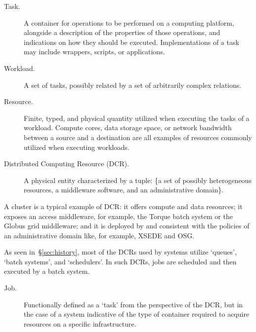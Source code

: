 \documentclass{sig-alternate}
\begin{document}
\begin{description}

\item[Task.] A container for operations to be performed on a computing
platform, alongside a description of the properties of those operations, and
indications on how they should be executed. Implementations of a task may
include wrappers, scripts, or applications.

\item[Workload.] A set of tasks, possibly related by a set of arbitrarily
complex relations.

\item[Resource.] Finite, typed, and physical quantity utilized when executing
the tasks of a workload. Compute cores, data storage space, or network
bandwidth between a source and a destination are all examples of resources
commonly utilized when executing workloads.

\item[Distributed Computing Resource (DCR).] A physical entity characterized by
a tuple: \{a set of possibly heterogeneous resources, a middleware software, and
an administrative domain\}.

\end{description}

A cluster is a typical example of DCR: it offers compute and data resources; it
exposes an access middleware, for example, the Torque batch system or the Globus
grid middleware; and it is deployed by and consistent with the policies of an
administrative domain like, for example, XSEDE and OSG.

As seen in~\S\ref{sec:history}, most of the DCRs used by \pilotjob systems
utilize `queues', `batch systems', and `schedulers'. In such DCRs, jobs are
scheduled and then executed by a batch system.

\begin{description}

\item[Job.] Functionally defined as a `task' from the perspective of the DCR,
but in the case of a \pilotjob system indicative of the type of container
required to acquire resources on a specific infrastructure.

\end{description}
\end{document}
